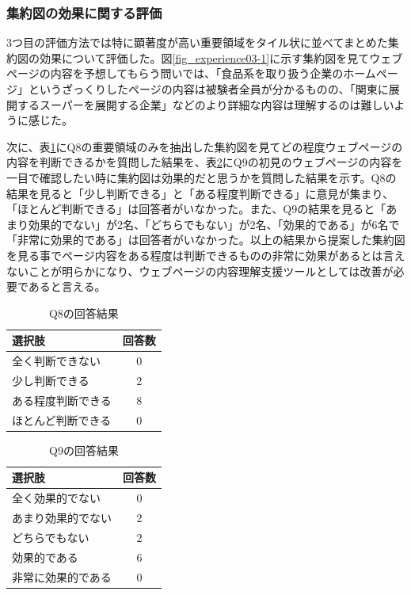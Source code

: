 \subsubsection{集約図の効果に関する評価}
\par 3つ目の評価方法では特に顕著度が高い重要領域をタイル状に並べてまとめた集約図の効果について評価した。図\ref{fig_experience03-1}に示す集約図を見てウェブページの内容を予想してもらう問いでは、「食品系を取り扱う企業のホームページ」というざっくりしたページの内容は被験者全員が分かるものの、「関東に展開するスーパーを展開する企業」などのより詳細な内容は理解するのは難しいように感じた。
\par 次に、表\ref{table:evaluation03-1}にQ8の重要領域のみを抽出した集約図を見てどの程度ウェブページの内容を判断できるかを質問した結果を、表\ref{table:evaluation03-2}にQ9の初見のウェブページの内容を一目で確認したい時に集約図は効果的だと思うかを質問した結果を示す。Q8の結果を見ると「少し判断できる」と「ある程度判断できる」に意見が集まり、「ほとんど判断できる」は回答者がいなかった。また、Q9の結果を見ると「あまり効果的でない」が2名、「どちらでもない」が2名、「効果的である」が6名で「非常に効果的である」は回答者がいなかった。以上の結果から提案した集約図を見る事でページ内容をある程度は判断できるものの非常に効果があるとは言えないことが明らかになり、ウェブページの内容理解支援ツールとしては改善が必要であると言える。

\begin{table}[H]
    \caption{Q8の回答結果}
    \label{table:evaluation03-1}
    \centering
     \begin{tabular}{lc}
      \hline
      選択肢 & 回答数 \\
      \hline \hline
      全く判断できない & 0 \\
      少し判断できる & 2 \\
      ある程度判断できる & 8 \\
      ほとんど判断できる & 0 \\
      \hline
    \end{tabular}
\end{table}

\begin{table}[H]
    \caption{Q9の回答結果}
    \label{table:evaluation03-2}
    \centering
     \begin{tabular}{lc}
      \hline
      選択肢 & 回答数 \\
      \hline \hline
      全く効果的でない & 0 \\
      あまり効果的でない & 2 \\
      どちらでもない & 2 \\
      効果的である & 6 \\
      非常に効果的である & 0 \\
      \hline
    \end{tabular}
\end{table}